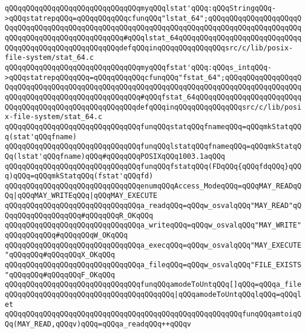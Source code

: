 \verb|qQQqqQQqqQQqqQQqqQQqqQQqqQQqqQQqmyqQQqlstat'qQQq:qQQqStringqQQq->qQQqstatrepqQQq=qQQqqQQqqQQqcfunqQQq"lstat_64";qQQqqQQqqQQqqQQqqQQqqQQqqQQqqQQqqQQqqQQqqQQqqQQqqQQqqQQqqQQqqQQqqQQqqQQqqQQqqQQqqQQqqQQqqQQqqQQqqQQqqQQqqQQqqQQqqQQqqQQq#qQQqlstat_64qQQqqQQqqQQqqQQqqQQqqQQqqQQqqQQqqQQqqQQqqQQqqQQqqQQqqQQqdefqQQqinqQQqqQQqqQQqqQQqsrc/c/lib/posix-file-system/stat_64.c|\newline
\verb|qQQqqQQqqQQqqQQqqQQqqQQqqQQqqQQqmyqQQqfstat'qQQq:qQQqs_intqQQq->qQQqstatrepqQQqqQQq=qQQqqQQqqQQqcfunqQQq"fstat_64";qQQqqQQqqQQqqQQqqQQqqQQqqQQqqQQqqQQqqQQqqQQqqQQqqQQqqQQqqQQqqQQqqQQqqQQqqQQqqQQqqQQqqQQqqQQqqQQqqQQqqQQqqQQqqQQqqQQqqQQq#qQQqfstat_64qQQqqQQqqQQqqQQqqQQqqQQqqQQqqQQqqQQqqQQqqQQqqQQqqQQqqQQqdefqQQqinqQQqqQQqqQQqqQQqsrc/c/lib/posix-file-system/stat_64.c|\newline
\newline
\verb|qQQqqQQqqQQqqQQqqQQqqQQqqQQqqQQqfunqQQqstatqQQqfnameqQQq=qQQqmkStatqQQq(stat'qQQqfname)|\newline
\verb|qQQqqQQqqQQqqQQqqQQqqQQqqQQqqQQqfunqQQqlstatqQQqfnameqQQq=qQQqmkStatqQQq(lstat'qQQqfname)qQQq#qQQqqQQqPOSIXqQQq1003.1aqQQq|\newline
\verb|qQQqqQQqqQQqqQQqqQQqqQQqqQQqqQQqfunqQQqfstatqQQq(FDqQQq{qQQqfdqQQq}qQQq)qQQq=qQQqmkStatqQQq(fstat'qQQqfd)|\newline
\newline
\verb|qQQqqQQqqQQqqQQqqQQqqQQqqQQqqQQqenumqQQqAccess_ModeqQQq=qQQqMAY_READqQQq|\verb#|qQQqMAY_WRITEqQQq|qQQqMAY_EXECUTE#\newline
\verb|qQQqqQQqqQQqqQQqqQQqqQQqqQQqqQQqa_readqQQq=qQQqw_osvalqQQq"MAY_READ"qQQqqQQqqQQqqQQqqQQq#qQQqqQQqR_OKqQQq|\newline
\verb|qQQqqQQqqQQqqQQqqQQqqQQqqQQqqQQqa_writeqQQq=qQQqw_osvalqQQq"MAY_WRITE"qQQqqQQqqQQq#qQQqqQQqW_OKqQQq|\newline
\verb|qQQqqQQqqQQqqQQqqQQqqQQqqQQqqQQqa_execqQQq=qQQqw_osvalqQQq"MAY_EXECUTE"qQQqqQQq#qQQqqQQqX_OKqQQq|\newline
\verb|qQQqqQQqqQQqqQQqqQQqqQQqqQQqqQQqa_fileqQQq=qQQqw_osvalqQQq"FILE_EXISTS"qQQqqQQq#qQQqqQQqF_OKqQQq|\newline
\verb|qQQqqQQqqQQqqQQqqQQqqQQqqQQqqQQqfunqQQqamodeToUntqQQq[]qQQq=qQQqa_file|\newline
\verb|qQQqqQQqqQQqqQQqqQQqqQQqqQQqqQQqqQQqqQQq|\verb#|qQQqamodeToUntqQQqlqQQq=qQQqlet#\newline
\verb|qQQqqQQqqQQqqQQqqQQqqQQqqQQqqQQqqQQqqQQqqQQqqQQqqQQqqQQqfunqQQqamtoiqQQq(MAY_READ,qQQqv)qQQq=qQQqa_readqQQq++qQQqv|\newline
